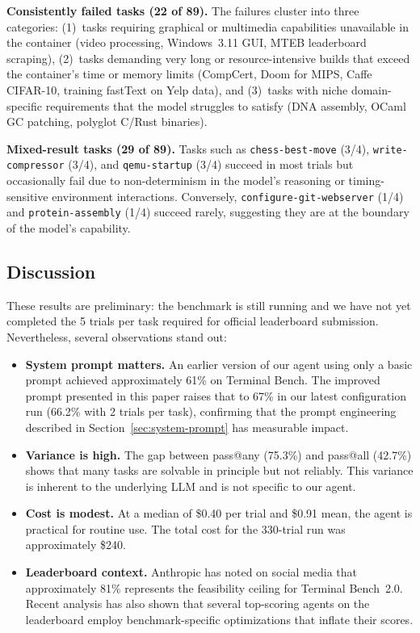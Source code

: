 \documentclass{article}
\begin{document}
\textbf{Consistently failed tasks (22 of 89).}
The failures cluster into three categories: (1)~tasks requiring
graphical or multimedia capabilities unavailable in the container
(video processing, Windows~3.11 GUI, MTEB leaderboard scraping),
(2)~tasks demanding very long or resource-intensive builds that exceed
the container's time or memory limits (CompCert, Doom for MIPS, Caffe
CIFAR-10, training fastText on Yelp data), and (3)~tasks with niche
domain-specific requirements that the model struggles to satisfy
(DNA assembly, OCaml GC patching, polyglot C/Rust binaries).

\textbf{Mixed-result tasks (29 of 89).}
Tasks such as \texttt{chess-best-move} (3/4), \texttt{write-compressor}
(3/4), and \texttt{qemu-startup} (3/4) succeed in most trials but
occasionally fail due to non-determinism in the model's reasoning or
timing-sensitive environment interactions.  Conversely,
\texttt{configure-git-webserver} (1/4) and \texttt{protein-assembly}
(1/4) succeed rarely, suggesting they are at the boundary of the
model's capability.

\subsection{Discussion}

These results are preliminary: the benchmark is still running and we
have not yet completed the 5 trials per task required for official
leaderboard submission.  Nevertheless, several observations stand out:

\begin{itemize}[nosep]
  \item \textbf{System prompt matters.}  An earlier version of
    our agent using only a basic prompt achieved approximately 61\% on
    Terminal Bench.  The improved prompt presented in this paper
    raises that to 67\% in our latest configuration run (66.2\% with
    2 trials per task), confirming that the prompt engineering
    described in Section~\ref{sec:system-prompt} has measurable impact.
  \item \textbf{Variance is high.}  The gap between pass@any
    (75.3\%) and pass@all (42.7\%) shows that many tasks are
    solvable in principle but not reliably.  This variance is
    inherent to the underlying LLM and is not specific to our agent.
  \item \textbf{Cost is modest.}  At a median of \$0.40 per trial
    and \$0.91 mean, the agent is practical for routine use.  The
    total cost for the 330-trial run was approximately \$240.
  \item \textbf{Leaderboard context.}  Anthropic has noted on social
    media that approximately 81\% represents the feasibility ceiling
    for Terminal Bench~2.0.  Recent analysis has also shown that
    several top-scoring agents on the leaderboard employ
    benchmark-specific optimizations that inflate their scores.
\end{itemize}
\end{document}

